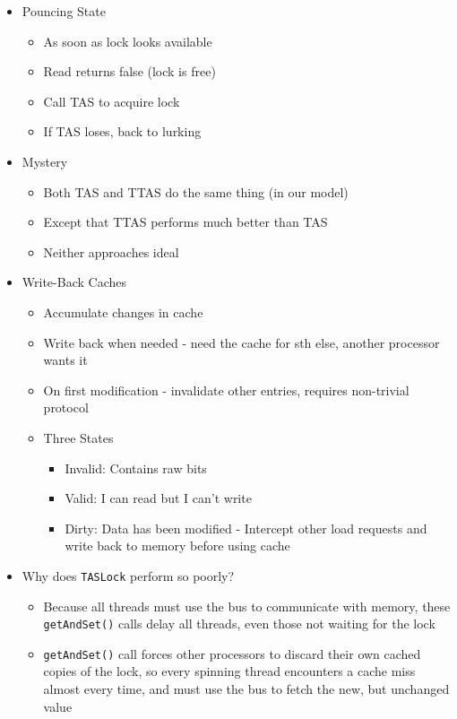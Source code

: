 \documentclass[12pt]{article}
\begin{document}
{\begin{itemize}
\begin{itemize}
				\item Pouncing State
				\begin{itemize}
					\item As soon as lock looks available
					\item Read returns false (lock is free)
					\item Call TAS to acquire lock
					\item If TAS loses, back to lurking
				\end{itemize}
				\item Mystery
				\begin{itemize}
					\item Both TAS and TTAS do the same thing (in our model)
					\item Except that TTAS performs much better than TAS
					\item Neither approaches ideal
				\end{itemize}
				\item Write-Back Caches
				\begin{itemize}
					\item Accumulate changes in cache
					\item Write back when needed - need the cache for sth else, another processor wants it
					\item On first modification - invalidate other entries, requires non-trivial protocol
					\item Three States
					\begin{itemize}
						\item Invalid: Contains raw bits
						\item Valid: I can read but I can't write
						\item Dirty: Data has been modified - Intercept other load requests and write back to memory before using cache
					\end{itemize}
				\end{itemize}
				\item Why does \texttt{TASLock} perform so poorly?
				\begin{itemize}
					\item Because all threads
					must use the bus to communicate with memory, these \texttt{getAndSet()} calls delay
					all threads, even those not waiting for the lock
					\item \texttt{getAndSet()} call forces other processors to discard their own cached copies of the lock, so every spinning thread encounters a cache miss almost every time, and must use the bus to fetch the new, but unchanged value

\end{itemize}
\end{itemize}
\end{itemize}}
\end{document}
